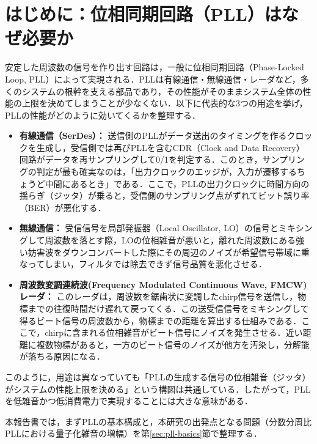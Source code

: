 \section{はじめに：位相同期回路（PLL）はなぜ必要か}
\label{sec:intro}

安定した周波数の信号を作り出す回路は，一般に位相同期回路（Phase-Locked Loop, PLL）によって実現される．PLLは有線通信・無線通信・レーダなど，多くのシステムの根幹を支える部品であり，その性能がそのままシステム全体の性能の上限を決めてしまうことが少なくない．以下に代表的な3つの用途を挙げ，PLLの性能がどのように効いてくるかを整理する．

\begin{itemize}
  \item \textbf{有線通信（SerDes）：} 送信側のPLLがデータ送出のタイミングを作るクロックを生成し，受信側では再びPLLを含むCDR（Clock and Data Recovery）回路がデータを再サンプリングして0/1を判定する．このとき，サンプリングの判定が最も確実なのは，「出力クロックのエッジが，入力が遷移するちょうど中間にあるとき」である．ここで，PLLの出力クロックに時間方向の揺らぎ（ジッタ）が乗ると，受信側のサンプリング点がずれてビット誤り率（BER）が悪化する．
  \item \textbf{無線通信：} 受信信号を局部発振器（Local Oscillator, LO）の信号とミキシングして周波数を落とす際，LOの位相雑音が悪いと，離れた周波数にある強い妨害波をダウンコンバートした際にその周辺のノイズが希望信号帯域に重なってしまい，フィルタでは除去できず信号品質を悪化させる．
  \item \textbf{周波数変調連続波(Frequency Modulated Continuous Wave, FMCW)レーダ：} このレーダは，周波数を鋸歯状に変調したchirp信号を送信し，物標までの往復時間だけ遅れて戻ってくる．この送受信信号をミキシングして得るビート信号の周波数から，物標までの距離を算出する仕組みである．ここで，chirpに含まれる位相雑音がビート信号にノイズを発生させる．近い距離に複数物標があると，一方のビート信号のノイズが他方を汚染し，分解能が落ちる原因になる．
\end{itemize}

このように，用途は異なっていても「PLLの生成する信号の位相雑音（ジッタ）がシステムの性能上限を決める」という構図は共通している．したがって，PLLを低雑音かつ低消費電力で実現することには大きな意味がある．

本報告書では，まずPLLの基本構成と，本研究の出発点となる問題（分数分周比PLLにおける量子化雑音の増幅）を第\ref{sec:pll-basics}節で整理する．

